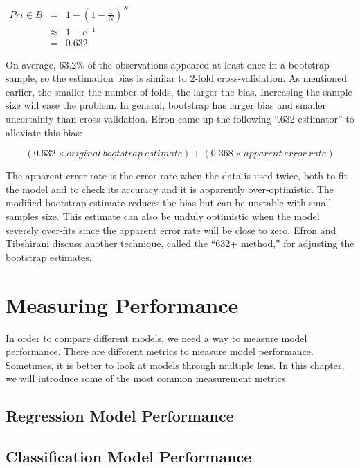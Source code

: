 \documentclass[12pt,]{krantz}
\theoremstyle{definition}
\theoremstyle{definition}
\theoremstyle{definition}
\theoremstyle{remark}
\begin{document}
\(\begin{array}{ccc} Pr{i\in B} & = & 1-\left(1-\frac{1}{N}\right)^{N}\\  & \approx & 1-e^{-1}\\  & = & 0.632 \end{array}\)

On average, 63.2\% of the observations appeared at least once in a
bootstrap sample, so the estimation bias is similar to 2-fold
cross-validation. As mentioned earlier, the smaller the number of folds,
the larger the bias. Increasing the sample size will ease the problem.
In general, bootstrap has larger bias and smaller uncertainty than
cross-validation. Efron came up the following ``.632 estimator'' to
alleviate this bias:

\[(0.632 × original\ bootstrap\ estimate) + (0.368 × apparent\ error\ rate)\]

The apparent error rate is the error rate when the data is used twice,
both to fit the model and to check its accuracy and it is apparently
over-optimistic. The modified bootstrap estimate reduces the bias but
can be unstable with small samples size. This estimate can also be
unduly optimistic when the model severely over-fits since the apparent
error rate will be close to zero. Efron and Tibshirani \citep{b632plus}
discuss another technique, called the ``632+ method,'' for adjusting the
bootstrap estimates.

\chapter{Measuring Performance}\label{measuring-performance}

In order to compare different models, we need a way to measure model
performance. There are different metrics to measure model performance.
Sometimes, it is better to look at models through multiple lens. In this
chapter, we will introduce some of the most common measurement metrics.

\section{Regression Model
Performance}\label{regression-model-performance}

\section{Classification Model
Performance}\label{classification-model-performance}
\end{document}
